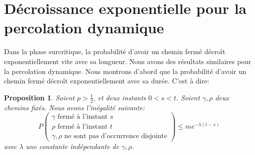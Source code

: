 \documentclass[titlepage,a4paper,12pt]{article}
\newcounter{prop}
\newtheorem{decexp}[prop]{Proposition}
\begin{document}
\section{Décroissance exponentielle pour la percolation dynamique}
Dans la phase surcritique, la probabilité d'avoir un chemin fermé décroît exponentiellement vite avec sa longueur. Nous avons des résultats similaires pour la percolation dynamique. Nous montrons d'abord que la probabilité d'avoir un chemin fermé décroît exponentiellement avec sa durée. C'est à dire:

\begin{decexp}
Soient $p>\frac{1}{2}$, et deux instants $0<s<t$. Soient $\gamma,\rho$ deux chemins fixés. Nous avons l'inégalité suivante:
$$P\left(\begin{array}{c} \gamma \text{ fermé à l'instant }s\\
\rho \text{ fermé à l'instant }t\\
\gamma, \rho \text{ ne sont pas d'occurrence disjointe}
\end{array}\right)\leqslant me^{-\lambda(t-s)}
$$
avec $\lambda$ une constante indépendante de $\gamma,\rho$.
\end{decexp}
\end{document}
